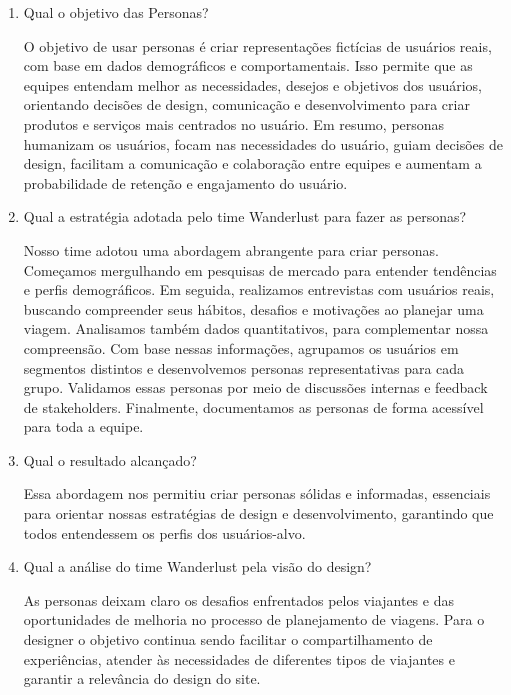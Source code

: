 \documentclass{article}
\begin{document}
\bigskip

\begin{enumerate}
      \item Qual o objetivo das Personas?

            O objetivo de usar personas é criar representações fictícias de usuários reais, com base em dados demográficos e comportamentais. Isso permite que as equipes entendam melhor as necessidades, desejos e objetivos dos usuários, orientando decisões de design, comunicação e desenvolvimento para criar produtos e serviços mais centrados no usuário. Em resumo, personas humanizam os usuários, focam nas necessidades do usuário, guiam decisões de design, facilitam a comunicação e colaboração entre equipes e aumentam a probabilidade de retenção e engajamento do usuário.

      \item Qual a estratégia adotada pelo time Wanderlust para fazer as personas?

            Nosso time adotou uma abordagem abrangente para criar personas. Começamos mergulhando em pesquisas de mercado para entender tendências e perfis demográficos. Em seguida, realizamos entrevistas com usuários reais, buscando compreender seus hábitos, desafios e motivações ao planejar uma viagem. Analisamos também dados quantitativos, para complementar nossa compreensão. Com base nessas informações, agrupamos os usuários em segmentos distintos e desenvolvemos personas representativas para cada grupo. Validamos essas personas por meio de discussões internas e feedback de stakeholders. Finalmente, documentamos as personas de forma acessível para toda a equipe.

      \item Qual o resultado alcançado?

            Essa abordagem nos permitiu criar personas sólidas e informadas, essenciais para orientar nossas estratégias de design e desenvolvimento, garantindo que todos entendessem os perfis dos usuários-alvo.

      \item Qual a análise do time Wanderlust pela visão do design?

            As personas deixam claro os desafios enfrentados pelos viajantes e das oportunidades de melhoria no processo de planejamento de viagens. Para o designer o objetivo continua sendo facilitar o compartilhamento de experiências, atender às necessidades de diferentes tipos de viajantes e garantir a relevância do design do site.

\end{enumerate}
\end{document}
